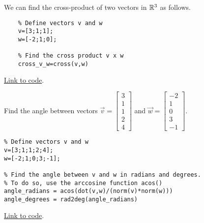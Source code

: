 \documentclass{ximera}
\begin{document}
\begin{template}\label{temp_oct_vec_cross}
We can find the cross-product of two vectors in $\mathbb{R}^3$ as follows.

\begin{verbatim}
    % Define vectors v and w
    v=[3;1;1];
    w=[-2;1;0];
    
    % Find the cross product v x w
    cross_v_w=cross(v,w)
    \end{verbatim}
    
    \href{https://sagecell.sagemath.org/?z=eJxTVXBJTcvMS1UoS00uyS8qVihTSMxLUSjn5SqzjTa2NrQ2jLXm5Sq3jdY1AnIMQBxeLlUFt0ygopKMVIXkovziYoWCovyU0uQSoOYKkFawYHxZfLktmKVRplOuCQBmGSA1&lang=octave&interacts=eJyLjgUAARUAuQ==}{Link to code}.

\end{template}

\begin{example}\label{ex:angleInOctave}
    Find the angle between vectors $\vec{v}=\begin{bmatrix}3\\1\\1\\2\\4\end{bmatrix}$ and $\vec{w}=\begin{bmatrix}-2\\1\\0\\3\\-1\end{bmatrix}$.
    \begin{explanation}
        \begin{verbatim}
% Define vectors v and w
v=[3;1;1;2;4];
w=[-2;1;0;3;-1];

% Find the angle between v and w in radians and degrees.  
% To do so, use the arccosine function acos()
angle_radians = acos(dot(v,w)/(norm(v)*norm(w))) 
angle_degrees = rad2deg(angle_radians)
        \end{verbatim}

\href{https://sagecell.sagemath.org/?z=eJxVjsEKgzAMhu9C3yEXoR3Kpu5WvI09wW4yRtdGV9haaGv7-qs6DyOHkJ98X1LCBUdtECLKYJ2HCMIoSKSI_dDxJlfLz3dOitQPdZvHE-943SwJKUq46rwdXpip6Y3wxJAQzW4BbcAJpYXxa6Bwcoh-AW8WlAVvK5g9bgYnpfXLL-NsZNDWgMgBZaRY5Y_d1G-5soHGKrEjNdZ9aGSHtSfGGOzI72BGMtzmif6p2BffHVEJ&lang=octave&interacts=eJyLjgUAARUAuQ==}{Link to code}.        
    \end{explanation}
\end{example}
\end{document}
